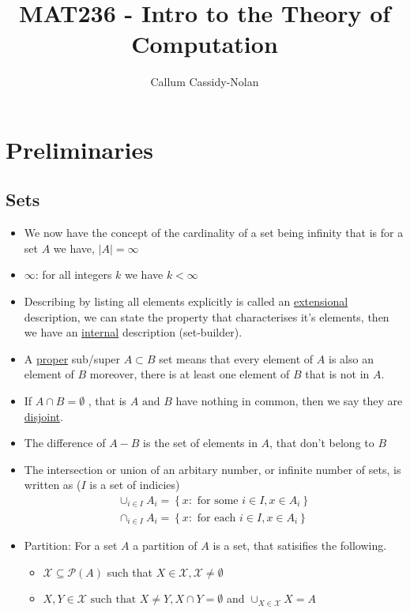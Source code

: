 \documentclass[11pt]{book}
\title{MAT236 - Intro to the Theory of Computation}
\author{Callum Cassidy-Nolan}
\begin{document}


\chapter{Preliminaries}%
\label{chp:preliminaries}

\section{Sets}%
\label{sec:sets}

\begin{itemize}
    \item We now have the concept of the cardinality of a set being infinity that is for a set $A$ we have, $\left| A \right| = \infty $
    \item $\infty $: for all integers $k$ we have $k < \infty $ 
    \item Describing by listing all elements explicitly is called an \underline{extensional}  description, we can state the property that characterises it's elements, then we have an \underline{internal} description (set-builder).
    \item A \underline{proper}  sub/super $A \subset B$ set means that every element of $A$ is also an element of $B$ moreover, there is at least one element of $B$ that is not in $A$.   
    \item If $A \cap  B = \emptyset  $ , that is $A \text{ and } B$ have nothing in common, then we say they are \underline{disjoint}.
    \item The difference of $A - B$ is the set of elements in $A$, that don't belong to $B$ 
    \item The intersection or union of an arbitary number, or infinite number of sets, is written as ($I$ is a set of indicies)
        \begin{gather*}
            \cup _{i \in I} A_{i} = \left\{ x: \text{ for some } i\in I, x \in A_{i}  \right\} \\
            \cap  _{i \in I} A_{i} = \left\{ x: \text{ for each } i\in I, x \in A_{i}  \right\} 
        \end{gather*}
    \item Partition: For a set $A$ a partition of $A$ is a set, that satisifies the following.
        \begin{itemize}
            \item $\mathcal{X} \subseteq \mathcal{P}(A) $ such that $X \in \mathcal{X}, \mathcal{X} \neq \emptyset $ 
        \item $X,Y \in \mathcal{X} \text{ such that } X\neq Y, X\cap Y= \emptyset $ and $\cup _{X\in \mathcal{X} } X= A$ 
        \end{itemize}
\end{itemize}
\end{document}
